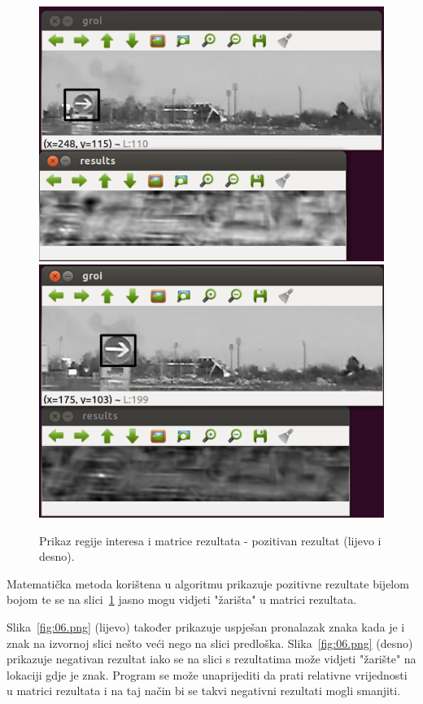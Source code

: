 \begin{figure}[!htb]
    \includegraphics[width=\linewidth]{figures/04.png}
\endminipage\hfill
{}
    \includegraphics[width=\linewidth]{figures/05.png}
\endminipage\hfill
\caption{Prikaz regije interesa i matrice rezultata - pozitivan rezultat
(lijevo i desno).}
\label{fig:04.png}
\end{figure}

Matematička metoda korištena u algoritmu prikazuje pozitivne rezultate
bijelom bojom te se na slici~\ref{fig:04.png} jasno mogu vidjeti
"žarišta" u matrici rezultata.

\newpage

Slika~\ref{fig:06.png} (lijevo) također prikazuje uspješan pronalazak
znaka kada
je i znak na izvornoj slici nešto veći nego na slici predloška.
Slika~\ref{fig:06.png} (desno) prikazuje negativan rezultat iako se na slici s
rezultatima može vidjeti "žarište" na lokaciji gdje je znak. Program se
može unaprijediti da prati relativne vrijednosti u matrici rezultata i
na taj način bi se takvi negativni rezultati mogli smanjiti.


